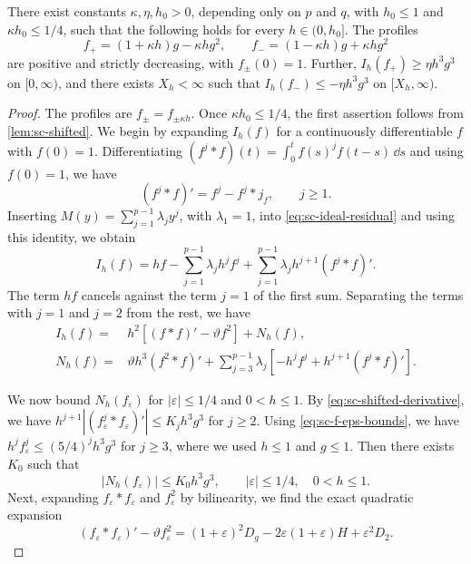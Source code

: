 \begin{lemma}
\label{lem:sc-critical-residuals}
There exist constants $\kappa,\eta,h_0>0$, depending only on $p$ and $q$, with $h_0\le1$ and $\kappa h_0\le1/4$, such that the following holds for every $h\in(0,h_0]$. The profiles
\[
 f_+=(1+\kappa h)g-\kappa hg^2,\qquad f_-=(1-\kappa h)g+\kappa hg^2
\]
are positive and strictly decreasing, with $f_\pm(0)=1$. Further, $I_h(f_+)\ge\eta h^3g^3$ on $[0,\infty)$, and there exists $X_h<\infty$ such that $I_h(f_-)\le-\eta h^3g^3$ on $[X_h,\infty)$.
\end{lemma}

\begin{proof}
The profiles are $f_\pm=f_{\pm\kappa h}$. Once $\kappa h_0\le1/4$, the first assertion follows from \cref{lem:sc-shifted}. We begin by expanding $I_h(f)$ for a continuously differentiable $f$ with $f(0)=1$. Differentiating $(f^j*f)(t)=\int_0^tf(s)^jf(t-s)\,\dd s$ and using $f(0)=1$, we have
\[
 (f^j*f)'=f^j-f^j*j_f,\qquad j\ge1 .
\]
Inserting $M(y)=\sum_{j=1}^{p-1}\lambda_jy^j$, with $\lambda_1=1$, into \eqref{eq:sc-ideal-residual} and using this identity, we obtain
\[
 I_h(f)=hf-\sum_{j=1}^{p-1}\lambda_jh^jf^j+\sum_{j=1}^{p-1}\lambda_jh^{j+1}(f^j*f)' .
\]
The term $hf$ cancels against the term $j=1$ of the first sum. Separating the terms with $j=1$ and $j=2$ from the rest, we have
\begin{align}
 I_h(f)={}&h^2[(f*f)'-\vartheta f^2]+N_h(f),\nonumber\\
 N_h(f)={}&\vartheta h^3(f^2*f)'
 +\sum_{j=3}^{p-1}\lambda_j
       [-h^jf^j+h^{j+1}(f^j*f)'].
 \label{eq:sc-ideal-expansion}
\end{align}

We now bound $N_h(f_\varepsilon)$ for $|\varepsilon|\le1/4$ and $0<h\le1$. By \eqref{eq:sc-shifted-derivative}, we have $h^{j+1}|(f_\varepsilon^j*f_\varepsilon)'|\le K_jh^3g^3$ for $j\ge2$. Using \eqref{eq:sc-f-eps-bounds}, we have $h^jf_\varepsilon^j\le(5/4)^jh^3g^3$ for $j\ge3$, where we used $h\le1$ and $g\le1$. Then there exists $K_0$ such that
\begin{equation}\label{eq:sc-N-bound}
 |N_h(f_\varepsilon)|\le K_0h^3g^3,\qquad |\varepsilon|\le1/4,\quad 0<h\le1 .
\end{equation}
Next, expanding $f_\varepsilon*f_\varepsilon$ and $f_\varepsilon^2$ by bilinearity, we find the exact quadratic expansion
\begin{equation}
 (f_\varepsilon*f_\varepsilon)'-\vartheta f_\varepsilon^2
 =(1+\varepsilon)^2D_g
 -2\varepsilon(1+\varepsilon)H+\varepsilon^2D_2.
 \label{eq:sc-quadratic-expansion}
\end{equation}


\end{proof}
